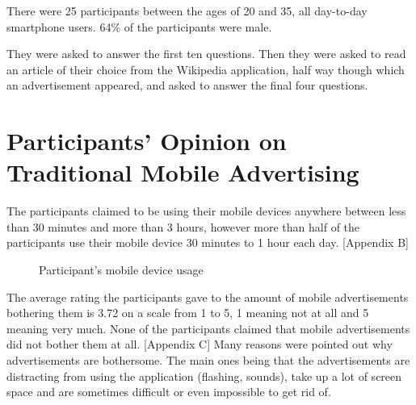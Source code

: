 There were 25 participants between the ages of 20 and 35, all day-to-day smartphone users. 64\% of the participants were male.

They were asked to answer the first ten questions. Then they were asked to read an article of their choice from the Wikipedia application, half way though which an advertisement appeared, and asked to answer the final four questions.

\section{Participants' Opinion on Traditional Mobile Advertising}

The participants claimed to be using their mobile devices anywhere between less than 30 minutes and more than 3 hours, however more than half of the participants use their mobile device 30 minutes to 1 hour each day. [Appendix B]

\begin{figure}
\caption{Participant's mobile device usage}
\end{figure}

The average rating the participants gave to the amount of mobile advertisements bothering them is 3.72 on a scale from 1 to 5, 1 meaning not at all and 5 meaning very much. None of the participants claimed that mobile advertisements did not bother them at all. [Appendix C] Many reasons were pointed out why advertisements are bothersome. The main ones being that the advertisements are distracting from using the application (flashing, sounds), take up a lot of screen space and are sometimes difficult or even impossible to get rid of.

